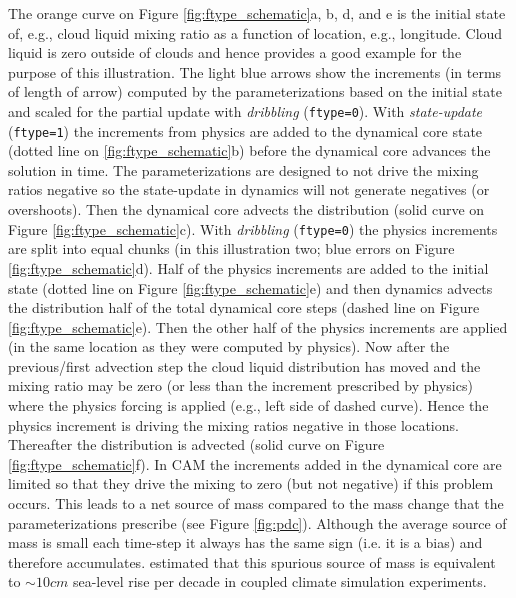\documentclass[draft,linenumbers]{agujournal}
\begin{document}
The orange curve on Figure \ref{fig:ftype_schematic}a, b, d, and e is the initial state of, e.g., cloud liquid mixing ratio as a function of location, e.g., longitude. Cloud liquid is zero outside of clouds and hence provides a good example for the purpose of this illustration. The light blue arrows show the increments (in terms of length of arrow) computed by the parameterizations based on the initial state and scaled for the partial update with {\em{dribbling}} ({\tt{ftype=0}}). With {\em{state-update}} ({\tt{ftype=1}}) the increments from physics are added to the dynamical core state (dotted line on \ref{fig:ftype_schematic}b) before the dynamical core advances the solution in time. The parameterizations are designed to not drive the mixing ratios negative so the state-update in dynamics will not generate negatives (or overshoots). Then the dynamical core advects the distribution (solid curve on Figure \ref{fig:ftype_schematic}c). With {\em{dribbling}} ({\tt{ftype=0}}) the physics increments are split into equal chunks (in this illustration two; blue errors on Figure \ref{fig:ftype_schematic}d). Half of the physics increments are added to the initial state (dotted line on Figure \ref{fig:ftype_schematic}e) and then dynamics advects the distribution half of the total dynamical core steps (dashed line on Figure \ref{fig:ftype_schematic}e). Then the other half of the physics increments are applied (in the same location as they were computed by physics). Now after the previous/first advection step the cloud liquid distribution has moved and the mixing ratio may be zero (or less than the increment prescribed by physics) where the physics forcing is applied (e.g., left side of dashed curve). Hence the physics increment is driving the mixing ratios negative in those locations. Thereafter the distribution is advected (solid curve on Figure \ref{fig:ftype_schematic}f). In CAM the increments added in the dynamical core are limited so that they drive the mixing to zero (but not negative) if this problem occurs. This leads to a net source of mass compared to the mass change that the parameterizations prescribe (see Figure \ref{fig:pdc}). Although the average source of mass is small each time-step it always has the same sign (i.e. it is a bias) and therefore accumulates. \citet{water-leak} estimated that this spurious source of mass is equivalent to $\sim 10cm$ sea-level rise per decade in coupled climate simulation experiments.
\end{document}
